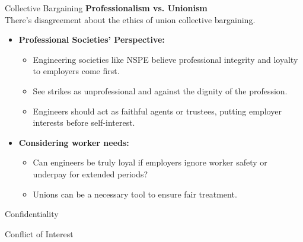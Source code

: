 \documentclass[11pt]{beamer}
\begin{document}
\begin{frame}[t,allowframebreaks]{Collective Bargaining}
        \textbf{Professionalism vs. Unionism}\\[5pt]
        There's disagreement about the ethics of union collective bargaining.\\[5pt]
        \begin{itemize}
            \item \textbf{Professional Societies' Perspective:}
            \begin{itemize}
                \item Engineering societies like NSPE believe professional integrity and loyalty to employers come
                first.
                \item See strikes as unprofessional and against the dignity of the profession.
                \item Engineers should act as faithful agents or trustees, putting employer interests before
                self-interest.
            \end{itemize}
            \item \textbf{Considering worker needs:}
            \begin{itemize}
                \item Can engineers be truly loyal if employers ignore worker safety or underpay for extended periods?
                \item Unions can be a necessary tool to ensure fair treatment.
            \end{itemize}
        \end{itemize}
%
%
    \end{frame}

    \begin{frame}[t]{Confidentiality}
    \end{frame}

    \begin{frame}[t]{Conflict of Interest}
    \end{frame}
\end{document}
